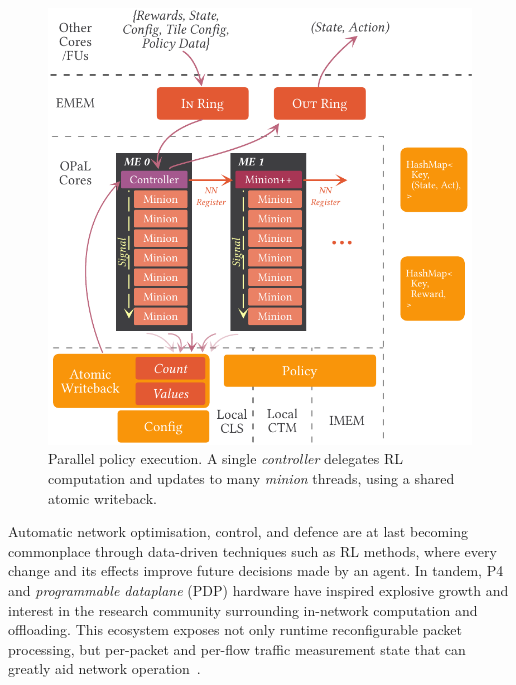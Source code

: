\documentclass[
sigconf,natbib=false
]{acmart}
\newcommand{\approachshort}{OPaL}
\begin{document}
\begin{figure}
	\centering
	\centering
	\includegraphics[keepaspectratio, width=0.8\linewidth]{figures/coop}
	\caption{Parallel policy execution. A single \emph{controller} delegates RL computation and updates to many \emph{minion} threads, using a shared atomic writeback.\label{fig:single-and-parallel:parallel}}
\end{figure}
Automatic network optimisation, control, and defence are at last becoming commonplace through data-driven techniques such as RL methods, where every change and its effects improve future decisions made by an agent.
In tandem, P4~\parencite{DBLP:journals/ccr/BosshartDGIMRSTVVW14} and \emph{programmable dataplane} (PDP) hardware have inspired explosive growth and interest in the research community surrounding in-network computation and offloading.
This ecosystem exposes not only runtime reconfigurable packet processing, but per-packet and per-flow traffic measurement state that can greatly aid network operation~\parencite{DBLP:conf/sosr/GhasemiBR17}.
\end{document}
